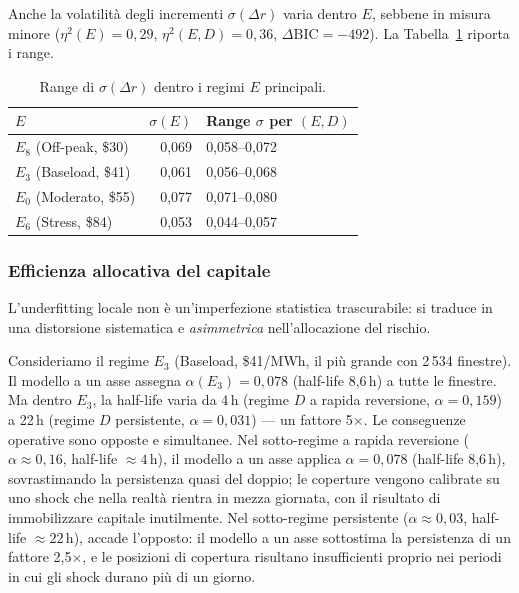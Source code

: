 \documentclass[12pt]{article}
\begin{document}
Anche la volatilità degli incrementi $\sigma(\Delta r)$ varia dentro $E$, sebbene in misura minore ($\eta^2(E) = 0{,}29$, $\eta^2(E,D) = 0{,}36$, $\Delta\text{BIC} = -492$).
La Tabella~\ref{tab:sigma_range} riporta i range.

\begin{table}[H]
\centering
\caption{Range di $\sigma(\Delta r)$ dentro i regimi $E$ principali.}
\label{tab:sigma_range}
\small
\begin{tabular}{lrl}
\toprule
$E$ & $\sigma(E)$ & Range $\sigma$ per $(E,D)$ \\
\midrule
$E_8$ (Off-peak, \$30) & 0,069 & 0,058--0,072 \\
$E_3$ (Baseload, \$41) & 0,061 & 0,056--0,068 \\
$E_0$ (Moderato, \$55) & 0,077 & 0,071--0,080 \\
$E_6$ (Stress, \$84) & 0,053 & 0,044--0,057 \\
\bottomrule
\end{tabular}
\end{table}

\subsubsection{Efficienza allocativa del capitale}
\label{sec:risk_implications}

L'underfitting locale non è un'imperfezione statistica trascurabile: si traduce in una distorsione sistematica e \emph{asimmetrica} nell'allocazione del rischio.

Consideriamo il regime $E_3$ (Baseload, \$41/MWh, il più grande con 2\,534 finestre).
Il modello a un asse assegna $\alpha(E_3) = 0{,}078$ (half-life 8,6\,h) a tutte le finestre.
Ma dentro $E_3$, la half-life varia da 4\,h (regime $D$ a rapida reversione, $\alpha = 0{,}159$) a 22\,h (regime $D$ persistente, $\alpha = 0{,}031$) --- un fattore 5$\times$.
Le conseguenze operative sono opposte e simultanee.
Nel sotto-regime a rapida reversione ($\alpha \approx 0{,}16$, half-life $\approx 4$\,h), il modello a un asse applica $\alpha = 0{,}078$ (half-life 8,6\,h), sovrastimando la persistenza quasi del doppio; le coperture vengono calibrate su uno shock che nella realtà rientra in mezza giornata, con il risultato di immobilizzare capitale inutilmente.
Nel sotto-regime persistente ($\alpha \approx 0{,}03$, half-life $\approx 22$\,h), accade l'opposto: il modello a un asse sottostima la persistenza di un fattore 2,5$\times$, e le posizioni di copertura risultano insufficienti proprio nei periodi in cui gli shock durano più di un giorno.
\end{document}
